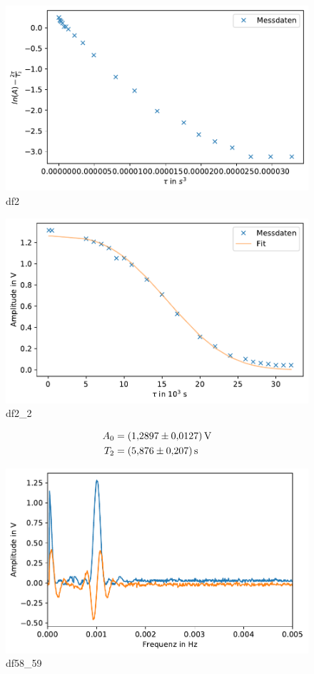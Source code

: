 \begin{figure}
    \center
    \includegraphics[scale = 1]{plots/df2.pdf}
    \caption{df2}
    \label{fig:df2}
\end{figure}
\begin{figure}
    \center
    \includegraphics[scale = 1]{plots/df2_2.pdf}
    \caption{df2\_2}
    \label{fig:df2_2}
\end{figure}

\begin{align*}
    A_0 &= \SI{1.2897 +- 0.0127}{\volt}\\
    T_2 &= \SI{5.876 +- 0.207}{\second}
\end{align*}

\begin{figure}
    \center
    \includegraphics[scale = 1]{plots/df58_59.pdf}
    \caption{df58\_59}
    \label{fig:df58_59}
\end{figure}

